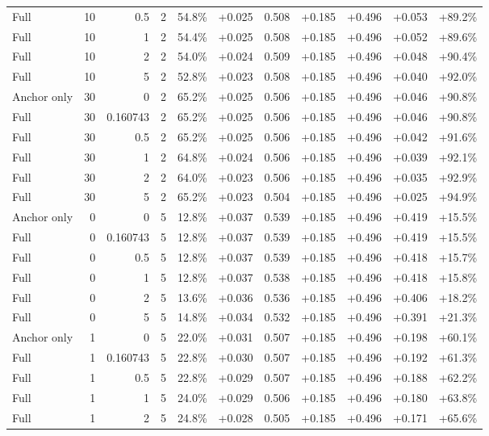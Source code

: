 \begin{table}[htbp]
\begin{tabular}{lrrrccccccc}
Full & 10 & 0.5 & 2 & 54.8\% & +0.025 & 0.508 & +0.185 & +0.496 & +0.053 & +89.2\% \\
Full & 10 & 1 & 2 & 54.4\% & +0.025 & 0.508 & +0.185 & +0.496 & +0.052 & +89.6\% \\
Full & 10 & 2 & 2 & 54.0\% & +0.024 & 0.509 & +0.185 & +0.496 & +0.048 & +90.4\% \\
Full & 10 & 5 & 2 & 52.8\% & +0.023 & 0.508 & +0.185 & +0.496 & +0.040 & +92.0\% \\
Anchor only & 30 & 0 & 2 & 65.2\% & +0.025 & 0.506 & +0.185 & +0.496 & +0.046 & +90.8\% \\
Full & 30 & 0.160743 & 2 & 65.2\% & +0.025 & 0.506 & +0.185 & +0.496 & +0.046 & +90.8\% \\
Full & 30 & 0.5 & 2 & 65.2\% & +0.025 & 0.506 & +0.185 & +0.496 & +0.042 & +91.6\% \\
Full & 30 & 1 & 2 & 64.8\% & +0.024 & 0.506 & +0.185 & +0.496 & +0.039 & +92.1\% \\
Full & 30 & 2 & 2 & 64.0\% & +0.023 & 0.506 & +0.185 & +0.496 & +0.035 & +92.9\% \\
Full & 30 & 5 & 2 & 65.2\% & +0.023 & 0.504 & +0.185 & +0.496 & +0.025 & +94.9\% \\
Anchor only & 0 & 0 & 5 & 12.8\% & +0.037 & 0.539 & +0.185 & +0.496 & +0.419 & +15.5\% \\
Full & 0 & 0.160743 & 5 & 12.8\% & +0.037 & 0.539 & +0.185 & +0.496 & +0.419 & +15.5\% \\
Full & 0 & 0.5 & 5 & 12.8\% & +0.037 & 0.539 & +0.185 & +0.496 & +0.418 & +15.7\% \\
Full & 0 & 1 & 5 & 12.8\% & +0.037 & 0.538 & +0.185 & +0.496 & +0.418 & +15.8\% \\
Full & 0 & 2 & 5 & 13.6\% & +0.036 & 0.536 & +0.185 & +0.496 & +0.406 & +18.2\% \\
Full & 0 & 5 & 5 & 14.8\% & +0.034 & 0.532 & +0.185 & +0.496 & +0.391 & +21.3\% \\
Anchor only & 1 & 0 & 5 & 22.0\% & +0.031 & 0.507 & +0.185 & +0.496 & +0.198 & +60.1\% \\
Full & 1 & 0.160743 & 5 & 22.8\% & +0.030 & 0.507 & +0.185 & +0.496 & +0.192 & +61.3\% \\
Full & 1 & 0.5 & 5 & 22.8\% & +0.029 & 0.507 & +0.185 & +0.496 & +0.188 & +62.2\% \\
Full & 1 & 1 & 5 & 24.0\% & +0.029 & 0.506 & +0.185 & +0.496 & +0.180 & +63.8\% \\
Full & 1 & 2 & 5 & 24.8\% & +0.028 & 0.505 & +0.185 & +0.496 & +0.171 & +65.6\% \\

\end{tabular}
\end{table}
